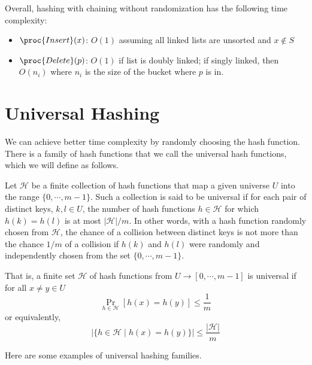 Overall, hashing with chaining without randomization has the following time complexity:
\begin{itemize}
    \item $\proc{Insert}(x)$: $O(1)$ assuming all linked lists are unsorted and $x \not\in S$
    \item $\proc{Delete}(p)$: $O(1)$ if list is doubly linked; if singly linked, then $O(n_i)$ where $n_i$ is the size of the bucket where $p$ is in.
\end{itemize}

\section{Universal Hashing}

We can achieve better time complexity by randomly choosing the hash function. There is a family of hash functions that we call the universal hash functions, which we will define as follows.

\begin{definition} 
    Let $\mathcal{H}$ be a finite collection of hash functions that map a given universe $U$ into the range $\{0,\cdots,m-1\}$. Such a collection is said to be universal if for each pair of distinct keys, $k,l \in U$, the number of hash functions $h \in \mathcal{H}$ for which $h(k) = h(l)$ is at most $|\mathcal{H}|/m$. In other words, with a hash function randomly chosen from $\mathcal{H}$, the chance of a collision between distinct keys is not more than the chance $1/m$ of a collision if $h(k)$ and $h(l)$ were randomly and independently chosen from the set $\{0,\cdots,m-1\}$.

    That is, a finite set $\mathcal{H}$ of hash functions from $U \to [0,\cdots,m-1]$ is universal if for all $x \neq y \in U$
    $$
    \Pr_{h \in \mathcal{H}} [h(x) = h(y)] \leq \frac{1}{m}
    $$
    or equivalently,
    $$
    \left| \{ h \in \mathcal{H} \mid h(x) = h(y) \} \right| \leq \frac{|\mathcal{H}|}{m}
    $$
\end{definition}

Here are some examples of universal hashing families.

